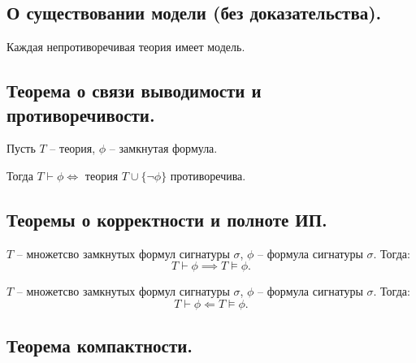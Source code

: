 
\subsection{О существовании модели (без доказательства).}

\begin{theorem}
    Каждая непротиворечивая теория имеет модель.
\end{theorem}

\subsection{Теорема о связи выводимости и противоречивости.}

\begin{theorem}
    Пусть $ T $ -- теория, $ \phi $ -- замкнутая формула.

    Тогда $ T \vdash \phi \iff $ теория $ T \cup \{\lnot\phi\} $ противоречива.
\end{theorem}

\subsection{Теоремы о корректности и полноте ИП.}

\begin{theorem}[Корректность ИП]
    $ T $ -- множетсво замкнутых формул сигнатуры $ \sigma $, $ \phi $ -- формула сигнатуры $ \sigma $. Тогда:
    \[
        T \vdash \phi \implies T \vDash \phi.
    \]
\end{theorem}

\begin{theorem}[Полнота ИП]
    $ T $ -- множетсво замкнутых формул сигнатуры $ \sigma $, $ \phi $ -- формула сигнатуры $ \sigma $. Тогда:
    \[
        T \vdash \phi \Leftarrow T \vDash \phi.
    \]
\end{theorem}

\subsection{Теорема компактности.}

